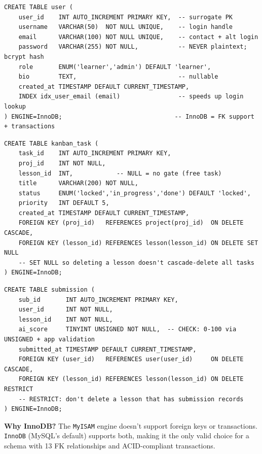 \documentclass[11pt,a4paper]{article}
\newcommand{\T}[1]{\texttt{#1}}          %
\begin{document}
\begin{lstlisting}[style=sql, caption={\T{user} table --- central auth entity}]
CREATE TABLE user (
    user_id    INT AUTO_INCREMENT PRIMARY KEY,  -- surrogate PK
    username   VARCHAR(50)  NOT NULL UNIQUE,    -- login handle
    email      VARCHAR(100) NOT NULL UNIQUE,    -- contact + alt login
    password   VARCHAR(255) NOT NULL,           -- NEVER plaintext; bcrypt hash
    role       ENUM('learner','admin') DEFAULT 'learner',
    bio        TEXT,                            -- nullable
    created_at TIMESTAMP DEFAULT CURRENT_TIMESTAMP,
    INDEX idx_user_email (email)                -- speeds up login lookup
) ENGINE=InnoDB;                               -- InnoDB = FK support + transactions
\end{lstlisting}

\begin{lstlisting}[style=sql, caption={\T{kanban\_task} --- the skill-gate pivot}]
CREATE TABLE kanban_task (
    task_id    INT AUTO_INCREMENT PRIMARY KEY,
    proj_id    INT NOT NULL,
    lesson_id  INT,            -- NULL = no gate (free task)
    title      VARCHAR(200) NOT NULL,
    status     ENUM('locked','in_progress','done') DEFAULT 'locked',
    priority   INT DEFAULT 5,
    created_at TIMESTAMP DEFAULT CURRENT_TIMESTAMP,
    FOREIGN KEY (proj_id)   REFERENCES project(proj_id)  ON DELETE CASCADE,
    FOREIGN KEY (lesson_id) REFERENCES lesson(lesson_id) ON DELETE SET NULL
    -- SET NULL so deleting a lesson doesn't cascade-delete all tasks
) ENGINE=InnoDB;
\end{lstlisting}

\begin{lstlisting}[style=sql, caption={\T{submission} --- trigger event source}]
CREATE TABLE submission (
    sub_id       INT AUTO_INCREMENT PRIMARY KEY,
    user_id      INT NOT NULL,
    lesson_id    INT NOT NULL,
    ai_score     TINYINT UNSIGNED NOT NULL,  -- CHECK: 0-100 via UNSIGNED + app validation
    submitted_at TIMESTAMP DEFAULT CURRENT_TIMESTAMP,
    FOREIGN KEY (user_id)   REFERENCES user(user_id)     ON DELETE CASCADE,
    FOREIGN KEY (lesson_id) REFERENCES lesson(lesson_id) ON DELETE RESTRICT
    -- RESTRICT: don't delete a lesson that has submission records
) ENGINE=InnoDB;
\end{lstlisting}

\begin{whybox}
\textbf{Why InnoDB?} The \T{MyISAM} engine doesn't support foreign keys or transactions.
\T{InnoDB} (MySQL's default) supports both, making it the only valid choice for a
schema with 13 FK relationships and ACID-compliant transactions.
\end{whybox}
\end{document}
